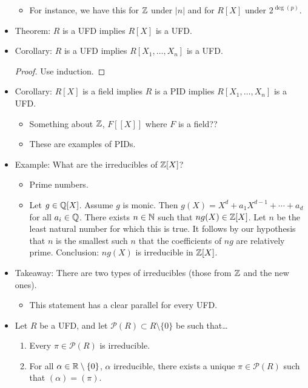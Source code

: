 \documentclass[../notes.tex]{subfiles}
\begin{document}
\begin{itemize}
\begin{itemize}
        \item For instance, we have this for $\mathbb{Z}$ under $|n|$ and for $R[X]$ under $2^{\deg(p)}$.
    \end{itemize}
    \item Theorem: $R$ is a UFD implies $R[X]$ is a UFD.
    \item Corollary: $R$ is a UFD implies $R[X_1,\dots,X_n]$ is a UFD.
    \begin{proof}
        Use induction.
    \end{proof}
    \item Corollary: $R[X]$ is a field implies $R$ is a PID implies $R[X_1,\dots,X_n]$ is a UFD.
    \begin{itemize}
        \item Something about $\mathbb{Z}$, $F[[X]]$ where $F$ is a field??
        \item These are examples of PIDs.
    \end{itemize}
    \item Example: What are the irreducibles of $\mathbb{Z}[X]$?
    \begin{itemize}
        \item Prime numbers.
        \item Let $g\in\mathbb{Q}[X]$. Assume $g$ is monic. Then $g(X)=X^d+a_1X^{d-1}+\cdots+a_d$ for all $a_i\in\mathbb{Q}$. There exists $n\in\mathbb{N}$ such that $ng(X)\in\mathbb{Z}[X]$. Let $n$ be the least natural number for which this is true. It follows by our hypothesis that $n$ is the smallest such $n$ that the coefficients of $ng$ are relatively prime. Conclusion: $ng(X)$ is irreducible in $\mathbb{Z}[X]$.
    \end{itemize}
    \item Takeaway: There are two types of irreducibles (those from $\mathbb{Z}$ and the new ones).
    \begin{itemize}
        \item This statement has a clear parallel for every UFD.
    \end{itemize}
    \item Let $R$ be a UFD, and let $\mathcal{P}(R)\subset R\setminus\{0\}$ be such that\dots
    \begin{enumerate}[label={(\roman*)}]
        \item Every $\pi\in\mathcal{P}(R)$ is irreducible.
        \item For all $\alpha\in\mathbb{R}\setminus\{0\}$, $\alpha$ irreducible, there exists a unique $\pi\in\mathcal{P}(R)$ such that $(\alpha)=(\pi)$.
    \end{enumerate}

\end{itemize}
\end{document}
